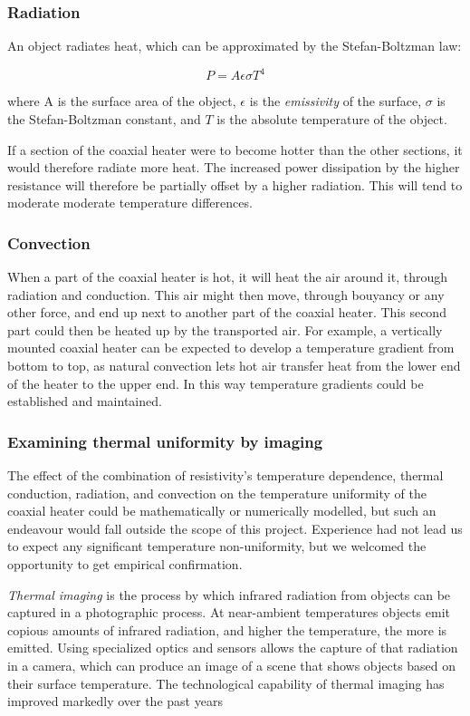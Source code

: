 \subsubsection{Radiation}

An object radiates heat, which can be approximated by the Stefan-Boltzman law:

\[P=A \epsilon \sigma T^4\]

where A is the surface area of the object, \(\epsilon\) is the
\textit{emissivity} of the surface, \(\sigma\) is the Stefan-Boltzman constant,
and \(T\) is the absolute temperature of the object. 

If a section of the coaxial heater were to become hotter than the other
sections, it would therefore radiate more heat. The increased power dissipation
by the higher resistance will therefore be partially offset by a higher
radiation. This will tend to moderate moderate temperature differences.

\subsubsection{Convection}

When a part of the coaxial heater is hot, it will heat the air around it,
through radiation and conduction. This air might then move, through bouyancy or
any other force, and end up next to another part of the coaxial heater. This
second part could then be heated up by the transported air. For example, a
vertically mounted coaxial heater can be expected to develop a temperature
gradient from bottom to top, as natural convection lets hot air transfer heat
from the lower end of the heater to the upper end.  In this way temperature
gradients could be established and maintained.

\subsubsection{Examining thermal uniformity by imaging}

The effect of the combination of resistivity's temperature dependence, thermal
conduction, radiation, and convection on the temperature uniformity of the
coaxial heater could be mathematically or numerically modelled, but such an
endeavour would fall outside the scope of this project. Experience had not lead
us to expect any significant temperature non-uniformity, but we welcomed the 
opportunity to get empirical confirmation.

\textit{Thermal imaging} is the process by which infrared radiation from objects
can be captured in a photographic process. At near-ambient temperatures objects
emit copious amounts of infrared radiation, and higher the temperature, the more
is emitted. Using specialized optics and sensors allows the capture of that
radiation in a camera, which can produce an image of a scene that shows objects
based on their surface temperature. The technological capability of thermal
imaging has improved markedly over the past years

